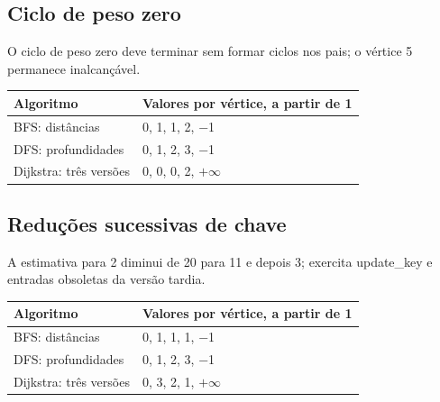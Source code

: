 \documentclass[a4paper,12pt]{article}
\begin{document}
\par\noindent\begin{minipage}{\textwidth}\subsection{Ciclo de peso zero}
O ciclo de peso zero deve terminar sem formar ciclos nos pais; o vértice 5 permanece inalcançável.
\par\smallskip\noindent\begin{minipage}{\textwidth}\centering
\begingroup\small
\setlength{\tabcolsep}{4pt}
\begin{tabular}{l>{\raggedright\arraybackslash}p{10.4cm}}
\toprule
Algoritmo & Valores por vértice, a partir de 1 \\
\midrule
BFS: distâncias & \num{0}, \num{1}, \num{1}, \num{2}, \num{-1} \\
DFS: profundidades & \num{0}, \num{1}, \num{2}, \num{3}, \num{-1} \\
Dijkstra: três versões & \num{0}, \num{0}, \num{0}, \num{2}, $+\infty$ \\
\bottomrule
\end{tabular}
\endgroup
\end{minipage}\par\smallskip
\end{minipage}\par\medskip
\par\noindent\begin{minipage}{\textwidth}\subsection{Reduções sucessivas de chave}
A estimativa para 2 diminui de 20 para 11 e depois 3; exercita update\_key e entradas obsoletas da versão tardia.
\par\smallskip\noindent\begin{minipage}{\textwidth}\centering
\begingroup\small
\setlength{\tabcolsep}{4pt}
\begin{tabular}{l>{\raggedright\arraybackslash}p{10.4cm}}
\toprule
Algoritmo & Valores por vértice, a partir de 1 \\
\midrule
BFS: distâncias & \num{0}, \num{1}, \num{1}, \num{1}, \num{-1} \\
DFS: profundidades & \num{0}, \num{1}, \num{2}, \num{3}, \num{-1} \\
Dijkstra: três versões & \num{0}, \num{3}, \num{2}, \num{1}, $+\infty$ \\
\bottomrule
\end{tabular}
\endgroup
\end{minipage}\par\smallskip
\end{minipage}\par\medskip
\end{document}
